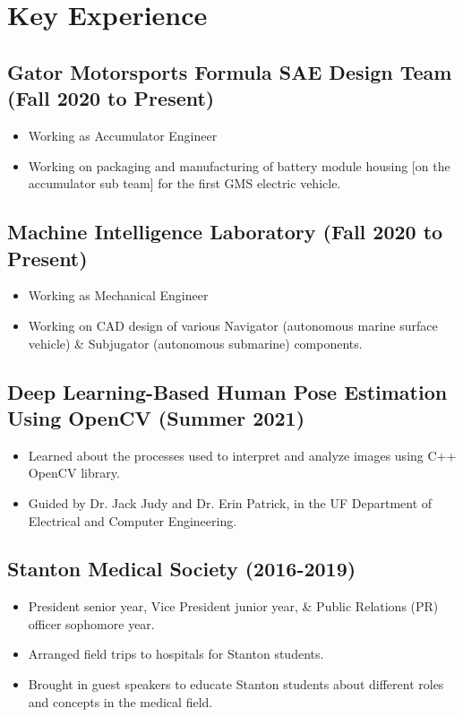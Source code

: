 \documentclass{article}
\newcommand{\sectionspacing}{\vspace{-.4em}} %
\newenvironment{CustomItemize}
{ \begin{itemize}[leftmargin=1em]
    \setlength{\itemsep}{0pt}
    \setlength{\parskip}{0pt}
    \setlength{\parindent}{0pt}
    \setlength{\parsep}{0pt}     }
{ \end{itemize}                  }
\begin{document}
\sectionspacing{}

\section{Key Experience}
\subsection{Gator Motorsports Formula SAE Design Team (Fall 2020 to Present)}
\begin{CustomItemize}
\item Working as Accumulator Engineer 
\item Working on packaging and manufacturing of battery module housing [on the accumulator sub team] for the first GMS electric vehicle.
\end{CustomItemize}

\subsection{Machine Intelligence Laboratory (Fall 2020 to Present)}
\begin{CustomItemize}
\item Working as Mechanical Engineer
\item Working on CAD design of various Navigator (autonomous marine surface vehicle) \& Subjugator (autonomous submarine) components.
\end{CustomItemize}

\subsection{Deep Learning-Based Human Pose Estimation Using OpenCV (Summer 2021)}
\begin{CustomItemize}
\item Learned about the processes used to interpret and analyze images using C++ OpenCV library.
\item Guided by Dr. Jack Judy and Dr. Erin Patrick, in the UF Department of Electrical and Computer Engineering.
\end{CustomItemize}

\subsection{Stanton Medical Society (2016-2019)}
\begin{CustomItemize}
\item President senior year, Vice President junior year, \& Public Relations (PR) officer sophomore year.
\item Arranged field trips to hospitals for Stanton students.
\item Brought in guest speakers to educate Stanton students about different roles and concepts in the medical field. 
\end{CustomItemize}
\end{document}
